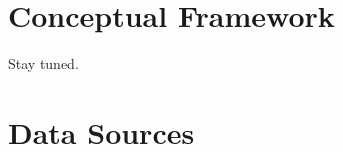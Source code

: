 \documentclass[12pt]{article}
\begin{document}
\section{Conceptual Framework}\label{section:model}

Stay tuned.

\section{Data Sources}\label{section:data}
\end{document}
